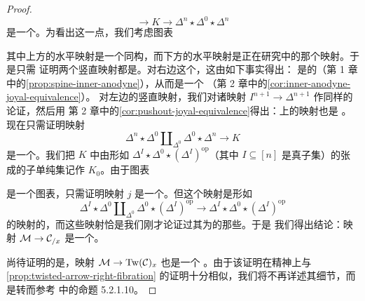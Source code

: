 \begin{proof}
\[  \to K \to \Delta^n \star \Delta^0 \star \Delta^n
\]
是一个\trJoyalEquivalence{}。为看出这一点，我们考虑图表
\begin{center}
\end{center}
其中上方的水平映射是一个同构，而下方的水平映射是正在研究中的那个映射。于是只需
证明两个竖直映射都是\trJoyalEquivalence{}。对右边这个，这由如下事实得出：\trSpineInclusion{}%
是\trInnerAnodyne{}的（第 1 章中的\cref{prop:spine-inner-anodyne}），从而是一个%
\trJoyalEquivalence{}（第 2 章中的\cref{cor:inner-anodyne-joyal-equivalence}）。
对左边的竖直映射，我们对诸映射 $I^{n+1} \to \Delta^{n+1}$ 作同样的论证，然后用
第 2 章中的\cref{cor:pushout-joyal-equivalence}得出：\trPushout{}上的映射也是%
\trJoyalEquivalence{}。现在只需证明映射
\[
\Delta^n \star \Delta^0 \amalg_{\Delta^0} \Delta^0 \star \Delta^n \to K
\]
是一个\trJoyalEquivalence{}。我们把 $K$ 中由形如
$\Delta^I \star \Delta^0 \star (\Delta^I)^{\mathrm{op}}$（其中
$I \subseteq [n]$ 是真子集）的\trSimplex{}张成的子单纯集记作 $K_0$。由于图表
\begin{center}
\end{center}
是一个\trPushout{}图表，只需证明映射 $j$ 是一个\trJoyalEquivalence{}。但这个映射是形如
\[
\Delta^I \star \Delta^0 \amalg_{\Delta^0} \Delta^0 \star (\Delta^I)^{\mathrm{op}}
  \to \Delta^I \star \Delta^0 \star (\Delta^I)^{\mathrm{op}}
\]
的映射的\trColimit{}，而这些映射恰是我们刚才论证过其为\trJoyalEquivalence{}的那些。于是
我们得出结论：映射 $\mathcal{M} \to \mathcal{C}_{/x}$ 是一个\trJoyalEquivalence{}。

尚待证明的是，映射 $\mathcal{M} \to \mathrm{Tw}(\mathcal{C})_x$ 也是一个%
\trJoyalEquivalence{}。由于该证明在精神上与\cref{prop:twisted-arrow-right-fibration}
的证明十分相似，我们将不再详述其细节，而是转而参考 \cite{Lur17} 中的命题
5.2.1.10。
\end{proof}

